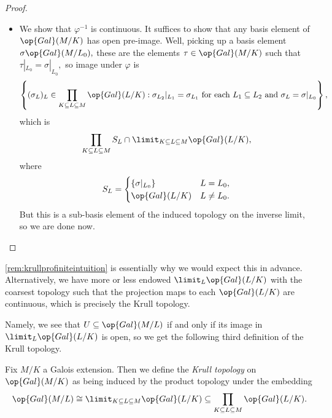 \begin{proof}
\begin{itemize}
		\item We show that $\varphi^{-1}$ is continuous. It suffices to show that any basis element of $\op{Gal}(M/K)$ has open pre-image. Well, picking up a basis element $\sigma\op{Gal}(M/L_0),$ these are the elements $\tau\in\op{Gal}(M/K)$ such that $\tau|_{L_0}=\sigma|_{L_0},$ so image under $\varphi$ is
		\[\left\{(\sigma_L)_L\in\prod_{K\subseteq L\subseteq M}\op{Gal}(L/K):\sigma_{L_2}|_{L_1}=\sigma_{L_1}\text{ for each }L_1\subseteq L_2\text{ and }\sigma_L=\sigma|_{L_0}\right\},\]
		which is
		\[\prod_{K\subseteq L\subseteq M}S_L\cap\limit_{K\subseteq L\subseteq M}\op{Gal}(L/K),\]
		where
		\[S_L=\begin{cases}
			\{\sigma|_{L_0}\} & L=L_0, \\
			\op{Gal}(L/K) & L\ne L_0.
		\end{cases}\]
		But this is a sub-basis element of the induced topology on the inverse limit, so we are done now.
		\qedhere
	\end{itemize}
\end{proof}
\begin{remark}
	\autoref{rem:krullprofiniteintuition} is essentially why we would expect this in advance. Alternatively, we have more or less endowed $\limit_{L}\op{Gal}(L/K)$ with the coarsest topology such that the projection maps to each $\op{Gal}(L/K)$ are continuous, which is precisely the Krull topology.
\end{remark}
Namely, we see that $U\subseteq\op{Gal}(M/L)$ if and only if its image in $\limit_L\op{Gal}(L/K)$ is open, so we get the following third definition of the Krull topology.
\begin{definition}
	Fix $M/K$ a Galois extension. Then we define the \textit{Krull topology} on $\op{Gal}(M/K)$ as being induced by the product topology under the embedding
	\[\op{Gal}(M/L)\cong\limit_{K\subseteq L\subseteq M}\op{Gal}(L/K)\subseteq\prod_{K\subseteq L\subseteq M}\op{Gal}(L/K).\]
\end{definition}

